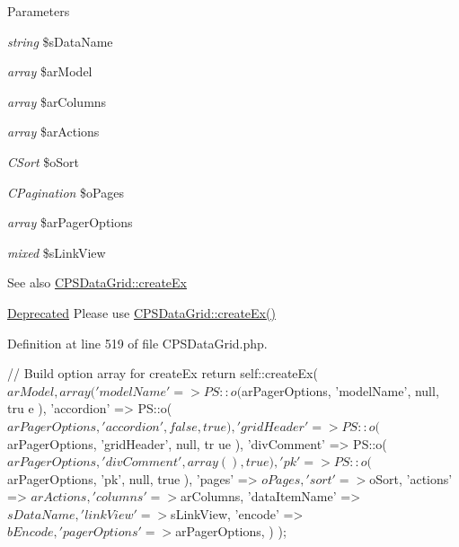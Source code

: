 \begin{DoxyParams}{Parameters}
\item[{\em string}]\$sDataName \item[{\em array}]\$arModel \item[{\em array}]\$arColumns \item[{\em array}]\$arActions \item[{\em CSort}]\$oSort \item[{\em CPagination}]\$oPages \item[{\em array}]\$arPagerOptions \item[{\em mixed}]\$sLinkView \end{DoxyParams}
\begin{DoxySeeAlso}{See also}
\hyperlink{classCPSDataGrid_aea971c9c726d0e1a6f345c986cca7ded}{CPSDataGrid::createEx} 
\end{DoxySeeAlso}
\begin{Desc}
\item[\hyperlink{deprecated__deprecated000007}{Deprecated}]Please use \hyperlink{classCPSDataGrid_aea971c9c726d0e1a6f345c986cca7ded}{CPSDataGrid::createEx()} \end{Desc}


Definition at line 519 of file CPSDataGrid.php.




\begin{DoxyCode}
    {
        //  Build option array for createEx
        return self::createEx( $arModel, 
            array(
                'modelName'     => PS::o( $arPagerOptions, 'modelName', null, tru
      e ),
                'accordion'     => PS::o( $arPagerOptions, 'accordion', false, tr
      ue ),
                'gridHeader'    => PS::o( $arPagerOptions, 'gridHeader', null, tr
      ue ),
                'divComment'    => PS::o( $arPagerOptions, 'divComment', array(),
       true ),
                'pk'            => PS::o( $arPagerOptions, 'pk', null, true ),
                'pages'         => $oPages,
                'sort'          => $oSort,
                'actions'       => $arActions,
                'columns'       => $arColumns,
                'dataItemName'  => $sDataName,
                'linkView'      => $sLinkView,
                'encode'        => $bEncode,
                'pagerOptions'  => $arPagerOptions,
            )
        );
    }
\end{DoxyCode}


